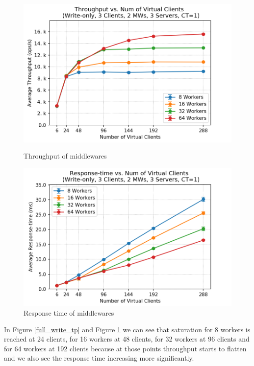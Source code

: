 \begin{figure}[H]
   \begin{minipage}{0.48\textwidth}
     \centering
     \includegraphics[width=1\linewidth]{figures/3_ThroughputForWrites/full_write_mw_tp_write_2018-11-09_13h02.png}
     \caption{Throughput of middlewares}\label{full_write_tp}
   \end{minipage}\hfill
   \begin{minipage}{0.48\textwidth}
     \centering
     \includegraphics[width=1\linewidth]{figures/3_ThroughputForWrites/full_write_rt_write_2018-11-09_13h02.png}
     \caption{Response time of middlewares}\label{full_write_rt}
   \end{minipage}
\end{figure}

In Figure \ref{full_write_tp} and Figure \ref{full_write_rt} we can see that saturation for 8 workers is reached at 24 clients, for 16 workers at 48 clients, for 32 workers at 96 clients and for 64 workers at 192 clients because at those points throughput starts to flatten and we also see the response time increasing more significantly. 

